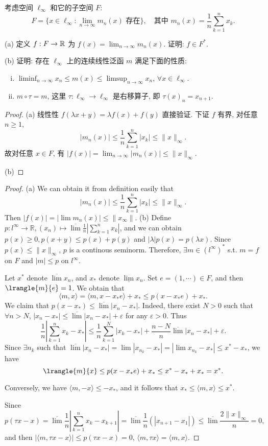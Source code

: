 \begin{exercise}
    考虑空间 $\ell_{\infty}$ 和它的子空间 $F$:
    \[F=\bigl\{x\in\ell_{\infty}\colon \lim_{n\to\infty}m_n(x)\text{\ 存在}\bigr\},\quad\text{其中\ }m_n(x)=\frac{1}{n}\sum_{k=1}^n x_k.\]

    (a) 定义 $f:F\to\mathbb{R}$ 为 $f(x)=\lim_{n\to\infty}m_n(x)$. 证明: $f\in F^*$.

    (b) 证明: 存在 $\ell_{\infty}$ 上的连续线性泛函 $m$ 满足下面的性质:
    \begin{enumerate}[(i)]
        \item $\liminf_{n\to\infty}x_n\leq m(x)\leq\limsup_{n\to\infty}x_n$, $\forall x\in\ell_{\infty}$.
        \item $m\circ\tau=m$, 这里 $\tau:\ell_{\infty}\to\ell_{\infty}$ 是右移算子, 即 $\tau(x)_n=x_{n+1}$.
    \end{enumerate}
\end{exercise}

\begin{proof}
    (a) 线性性 $f(\lambda x+y)=\lambda f(x)+f(y)$ 直接验证. 下证 $f$ 有界, 对任意 $n\geq 1$,
    \[|m_n(x)|\leq\frac{1}{n}\sum_{k=1}^n |x_k|\leq\|x\|_{\infty}.\]
    故对任意 $x\in F$, 有 $|f(x)|=\lim_{n\to\infty}|m_n(x)|\leq\|x\|_{\infty}$.

    (b)
\end{proof}

\begin{proof}
    (a) We can obtain it from definition easily that 
    \[ |m_n(x)| \leq \frac1n\sum_{k=1}^n |x_k|\leq \|x\|_\infty. \]
    Then $|f(x)| = |\lim m_n(x)|\leq \|x_\infty\|.$
    (b) Define $p: l^\infty\to \mathbb R, (x_n)\mapsto \overline\lim \frac1n|\sum_{k = 1}^nx_k|$, and we can obtain $p(x) \geq 0, p(x + y)\leq p(x) + p(y)$ and $|\lambda|p(x) = p(\lambda x)$. Since $p(x) \leq \|x\|_\infty$, $p$ is a continous seminorm. Therefore, $\exists m\in (l^\infty)^*$ s.t. $m = f$ on $F$ and $|m|\leq p$ on $l^\infty$. 
    
    Let $x^*$ denote $\overline\lim x_n$, and $x_*$ denote $\underline \lim x_n$. Set $e = (1, \cdots)\in F$, and then $\lrangle{m}{e} = 1$. We obtain that 
    \[ \langle m, x\rangle  = \langle m, x-x_*e\rangle + x_* \leq p(x-x_*e) + x_*.\]
    We claim that $p(x-x_*)\leq \overline\lim |x_n - x_*|$. Indeed, there exist $N>0$ such that $\forall n > N$, $|x_n - x_*| \leq \overline\lim |x_n - x_*| + \varepsilon$ for any $\varepsilon>0$. Thus 
    \[ \frac1n|\sum_{k=1}^n x_k - x_*|\leq \frac1n \sum_{k=1}^N |x_k - x_*| + \frac{n-N}{n}\overline\lim|x_n - x_*| + \varepsilon. \]
    Since $\exists n_k$ such that $\overline\lim |x_n - x_*|=\lim |x_{n_k} - x_*| = |\lim x_{n_k} - x_*| \leq x^*-x_*$,  we have 
    \[ \lrangle{m}{x}\leq p(x - x_*e) + x_*\leq x^* - x_* + x_* = x^*. \]
    
    Conversely, we have $\langle m, -x\rangle \leq -x_*$, and it follows that $x_*\leq \langle m, x\rangle \leq x^*$.

    Since
    \[ p(\tau x - x) = \overline\lim \frac1n |\sum_{k = 1}^nx_k - x_{k+1}| = \overline\lim\frac1n(|x_{n+1}-x_1|)\leq \overline\lim \frac{2\|x\|_\infty}{n} = 0, \]
    and then $|\langle m, \tau x - x\rangle|\leq p(\tau x - x) = 0$, $\langle m, \tau x\rangle = \langle m, x\rangle$. 
\end{proof}